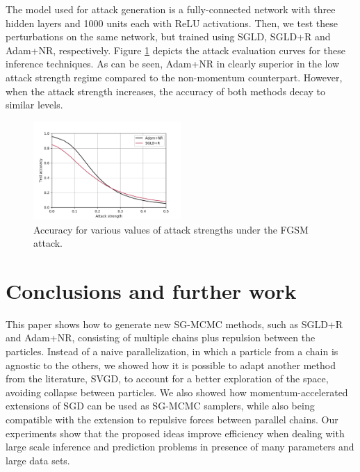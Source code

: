The model used for attack generation is a fully-connected network with three hidden layers and 1000 units each with ReLU activations. Then, we test these perturbations on the same network, but trained using SGLD, SGLD+R and Adam+NR, respectively. Figure \ref{fig:attacks} depicts the attack evaluation curves for these inference techniques. As can be seen, Adam+NR in clearly superior in the low attack strength regime compared to the non-momentum counterpart. However, when the attack strength increases, the accuracy of both methods decay to similar levels.



\begin{figure}[!h]
    \centering
\includegraphics[width=0.5\textwidth]{img/adv-2}
    \caption{Accuracy for various values of attack strengths under the FGSM attack.}\label{fig:attacks}
\end{figure}





\section{Conclusions and further work}\label{sec:conclusion}

This paper shows how to generate new SG-MCMC methods, such as SGLD+R and Adam+NR, consisting of multiple chains plus repulsion between the particles. Instead of a naive parallelization, in which a particle from a chain is agnostic to the others, we showed how it is possible to adapt another method from the literature, SVGD, to account for a better exploration of the space, avoiding collapse between particles. We also showed how momentum-accelerated extensions of SGD can be used as SG-MCMC samplers, while also being compatible with the extension to repulsive forces between parallel chains. Our 
experiments show that the proposed ideas improve efficiency when dealing 
with large scale inference and prediction problems in presence of many 
parameters and large data sets.

